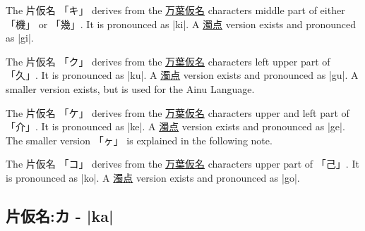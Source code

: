 \documentclass[paper=a4,headings=small,titlepage,makeidx,fontsize=12pt]{scrbook}
\begin{document}
 The 片仮名 {「キ」} derives from the
\hyperref[sec:Manyogana]{万葉仮名} characters middle part of either {「機」} or
{「幾」}.  It is pronounced as |ki|.  A \hyperref[sec:Dakuten]{濁点} version
exists and pronounced as |gi|.


 The 片仮名 {「ク」} derives from the
\hyperref[sec:Manyogana]{万葉仮名} characters left upper part of {「久」}.  It
is pronounced as |ku|.  A \hyperref[sec:Dakuten]{濁点} version exists and
pronounced as |gu|.  A smaller version exists, but is used for the Ainu
Language.



 The 片仮名 {「ケ」} derives from the
\hyperref[sec:Manyogana]{万葉仮名} characters upper and left part of {「介」}.
It is pronounced as |ke|.  A \hyperref[sec:Dakuten]{濁点} version exists and
pronounced as |ge|.  The smaller version {「ヶ」} is explained in the following
note.

\newpage


 The 片仮名 {「コ」} derives from the
\hyperref[sec:Manyogana]{万葉仮名} characters upper part of {「己」}.  It is
pronounced as |ko|.  A \hyperref[sec:Dakuten]{濁点} version exists and
pronounced as |go|.



\newpage

\subsection{片仮名:カ - |ka|} \label{sec:KatakanaKa}

\end{document}
